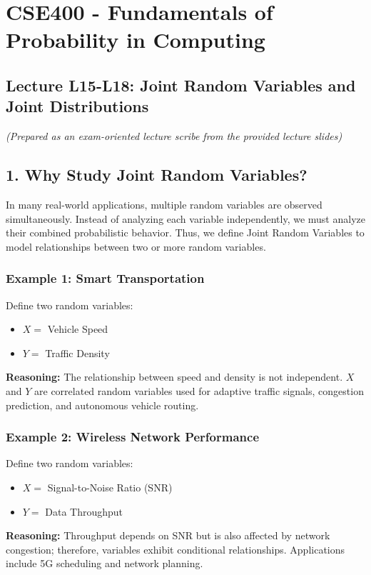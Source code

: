 \documentclass{article}
\begin{document}
\section*{CSE400 - Fundamentals of Probability in Computing}
\subsection*{Lecture L15-L18: Joint Random Variables and Joint Distributions}
\textit{(Prepared as an exam-oriented lecture scribe from the provided lecture slides)}

\subsection*{1. Why Study Joint Random Variables?}
In many real-world applications, multiple random variables are observed simultaneously. Instead of analyzing each variable independently, we must analyze their combined probabilistic behavior. Thus, we define Joint Random Variables to model relationships between two or more random variables.

\subsubsection*{Example 1: Smart Transportation}
Define two random variables:
\begin{itemize}
    \item $X =$ Vehicle Speed
    \item $Y =$ Traffic Density
\end{itemize}
\textbf{Reasoning:} The relationship between speed and density is not independent. $X$ and $Y$ are correlated random variables used for adaptive traffic signals, congestion prediction, and autonomous vehicle routing.

\subsubsection*{Example 2: Wireless Network Performance}
Define two random variables:
\begin{itemize}
    \item $X =$ Signal-to-Noise Ratio (SNR)
    \item $Y =$ Data Throughput
\end{itemize}
\textbf{Reasoning:} Throughput depends on SNR but is also affected by network congestion; therefore, variables exhibit conditional relationships. Applications include 5G scheduling and network planning.
\end{document}
